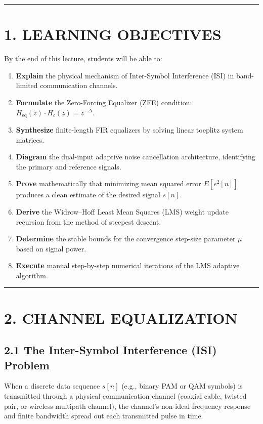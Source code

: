 \documentclass[11pt,a4paper]{article}
\begin{document}
\noindent\rule{\textwidth}{0.5pt}

\section{1. LEARNING OBJECTIVES}
By the end of this lecture, students will be able to:
\begin{enumerate}
    \item \textbf{Explain} the physical mechanism of Inter-Symbol Interference (ISI) in band-limited communication channels.
    \item \textbf{Formulate} the Zero-Forcing Equalizer (ZFE) condition: $H_{\text{eq}}(z) \cdot H_c(z) = z^{-\Delta}$.
    \item \textbf{Synthesize} finite-length FIR equalizers by solving linear toeplitz system matrices.
    \item \textbf{Diagram} the dual-input adaptive noise cancellation architecture, identifying the primary and reference signals.
    \item \textbf{Prove} mathematically that minimizing mean squared error $E[e^2[n]]$ produces a clean estimate of the desired signal $s[n]$.
    \item \textbf{Derive} the Widrow--Hoff Least Mean Squares (LMS) weight update recursion from the method of steepest descent.
    \item \textbf{Determine} the stable bounds for the convergence step-size parameter $\mu$ based on signal power.
    \item \textbf{Execute} manual step-by-step numerical iterations of the LMS adaptive algorithm.
\end{enumerate}

\noindent\rule{\textwidth}{0.5pt}

\section{2. CHANNEL EQUALIZATION}

\subsection{2.1 The Inter-Symbol Interference (ISI) Problem}
When a discrete data sequence $s[n]$ (e.g., binary PAM or QAM symbols) is transmitted through a physical communication channel (coaxial cable, twisted pair, or wireless multipath channel), the channel's non-ideal frequency response and finite bandwidth spread out each transmitted pulse in time.
\end{document}

